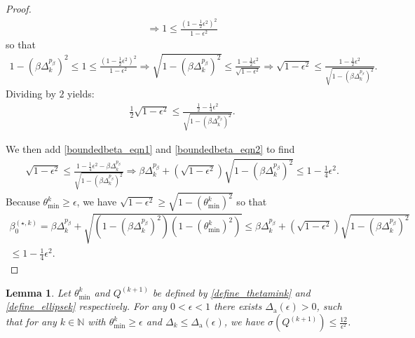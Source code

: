 \documentclass{article}
\newtheorem{lemma}[theorem]{Lemma}
\theoremstyle{case}
\numberwithin{theorem}{subsection}
\newcommand{\bsk}{{\beta_0^{(\star, k)}}}
\newcommand{\dacco}{{\Delta_{\textrm{a}}}}
\newcommand{\dk}{\Delta_k}
\newcommand{\naturals}{\mathbb N}
\newcommand{\thetamink}{{\theta^k_{\textrm{min}}}}
\newcommand{\qkpo}{{Q^{(k+1)}}}
\begin{document}
\begin{proof}
\begin{align*}
\Longrightarrow 1 \le \frac{\left(1 - \frac 1 2 \epsilon^2\right)^2}{1 - \epsilon^2}
\end{align*}
so that
\begin{align*}
1 - \left(\beta\dk^{p_{\beta}}\right)^2 \le 1 \le \frac{\left(1 - \frac 1 2 \epsilon^2\right)^2}{1 - \epsilon^2} 
\Longrightarrow \sqrt{1 - \left(\beta\dk^{p_{\beta}}\right)^2}\le \frac{1 - \frac 1 2 \epsilon^2}{\sqrt{1 - \epsilon^2} } 
\Longrightarrow \sqrt{1 - \epsilon^2} \le \frac{1 - \frac 1 2 \epsilon^2}{\sqrt{1 - \left(\beta\dk^{p_{\beta}}\right)^2}}.
\end{align*}
Dividing by $2$ yields:
\begin{align}
\frac 1 2 \sqrt{1 - \epsilon^2} \le \frac{\frac 1 2 - \frac 1 4 \epsilon^2}{\sqrt{1 - \left(\beta\dk^{p_{\beta}}\right)^2}}
\label{boundedbeta_eqn2}.
\end{align}

We then add \cref{boundedbeta_eqn1} and \cref{boundedbeta_eqn2} to find
\begin{align*}
\sqrt{1 - \epsilon^2} \le \frac{1 -  \frac 1 4 \epsilon^2 - \beta\dk^{p_{\beta}}}{\sqrt{1 - \left(\beta\dk^{p_{\beta}}\right)^2}}
\Longrightarrow \beta\dk^{p_{\beta}} + \left(\sqrt{1 - \epsilon^2}\right)\sqrt{1 - \left(\beta\dk^{p_{\beta}}\right)^2} \le 1 -  \frac 1 4 \epsilon^2.
\end{align*}
Because $\thetamink \ge \epsilon$, we have $\sqrt{1 - \epsilon^2} \ge \sqrt{1 - \left(\thetamink\right)^2}$
so that
\begin{align*}
\bsk 
= \beta\dk^{p_{\beta}} + \sqrt{\left(1 - \left(\beta\dk^{p_{\beta}}\right)^2\right)\left(1 - \left(\thetamink\right)^2\right)} 
\le \beta\dk^{p_{\beta}} + \left(\sqrt{1 - \epsilon^2}\right)\sqrt{1 - \left(\beta\dk^{p_{\beta}}\right)^2} \\
\le 1 -  \frac 1 4 \epsilon^2.
\end{align*}
\end{proof}



\begin{lemma}
\label{boundbeta}
Let $\thetamink$ and $\qkpo$ be defined by \cref{define_thetamink} and \cref{define_ellipsek} respectively.
For any $0 < \epsilon < 1$ there exists $\dacco(\epsilon) > 0$, such that for any $k \in \naturals$ with
$\thetamink \ge \epsilon$ and $\dk \le \dacco(\epsilon)$, we have $\sigma(\qkpo) \le \frac{12}{\epsilon^2}$.
\end{lemma}
\end{document}
